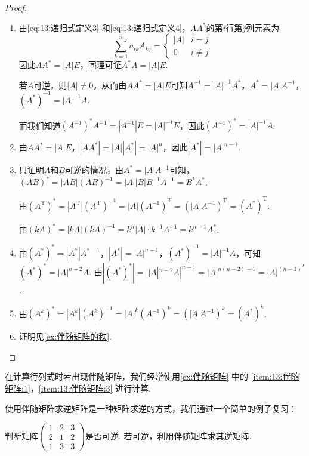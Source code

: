 \begin{proof}
    \begin{enumerate}
        \item 由\autoref{eq:13:递归式定义3} 和\autoref{eq:13:递归式定义4}，$AA^*$的第$i$行第$j$列元素为
              \[\sum_{k=1}^{n}a_{ik}A_{kj}=\begin{cases}
                      |A| & i=j      \\
                      0   & i \neq j
                  \end{cases}\]
              因此$AA^*=|A|E$，同理可证$A^*A=|A|E$.

              若$A$可逆，则$|A| \neq 0$，从而由$AA^*=|A|E$可知$A^{-1}=|A|^{-1}A^*$，$A^*=|A|A^{-1}$，$(A^*)^{-1}=|A|^{-1}A$.

              而我们知道$(A^{-1})^*A^{-1}=|A^{-1}|E=|A|^{-1}E$，因此$(A^{-1})^*=|A|^{-1}A$.

        \item 由$AA^*=|A|E$，$|AA^*|=|A||A^*|=|A|^n$，因此$|A^*|=|A|^{n-1}$.

        \item 只证明$A$和$B$可逆的情况，由$A^*=|A|A^{-1}$可知，$(AB)^*=|AB|(AB)^{-1}=|A||B|B^{-1}A^{-1}=B^*A^*$.

              由$(A^\mathrm{T})^*=|A^\mathrm{T}|(A^\mathrm{T})^{-1}=|A|(A^{-1})^\mathrm{T}=(|A|A^{-1})^\mathrm{T}=(A^*)^\mathrm{T}$.

              由$(kA)^*=|kA|(kA)^{-1}=k^n|A|\cdot k^{-1}A^{-1}=k^{n-1}A^*$.

        \item 由$(A^*)^*=|A^*|A^{*-1}$，$|A^*|=|A|^{n-1}$，$(A^*)^{-1}=|A|^{-1}A$，可知$(A^*)^*=|A|^{n-2}A$. 由$|(A^*)^*|=||A|^{n-2}A|^{n-1}=|A|^{n(n-2)+1}=|A|^{(n-1)^2}$.

        \item 由$(A^k)^*=|A^k|(A^k)^{-1}=|A|^k(A^{-1})^k=(|A|A^{-1})^k=(A^*)^k$.

        \item 证明见\autoref{ex:伴随矩阵的秩}.
    \end{enumerate}
\end{proof}

在计算行列式时若出现伴随矩阵，我们经常使用\autoref{ex:伴随矩阵} 中的 \ref*{item:13:伴随矩阵:1}，\ref*{item:13:伴随矩阵:3} 进行计算.

使用伴随矩阵求逆矩阵是一种矩阵求逆的方式，我们通过一个简单的例子复习：
\begin{example}{}{}
    判断矩阵$\begin{pmatrix}
            1 & 2 & 3 \\ 2 & 1 & 2 \\ 1 & 3 & 3
        \end{pmatrix}$是否可逆. 若可逆，利用伴随矩阵求其逆矩阵.
\end{example}

